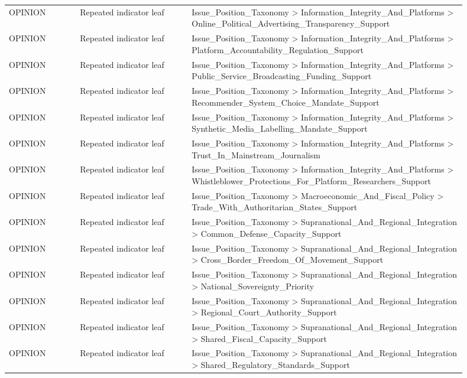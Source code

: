 \begin{table}[htbp]
\begin{threeparttable}
\begin{tabular}{p{0.14\linewidth}p{0.22\linewidth}p{0.54\linewidth}}
OPINION & Repeated indicator leaf & Issue\_Position\_Taxonomy > Information\_Integrity\_And\_Platforms > Online\_Political\_Advertising\_Transparency\_Support \\
OPINION & Repeated indicator leaf & Issue\_Position\_Taxonomy > Information\_Integrity\_And\_Platforms > Platform\_Accountability\_Regulation\_Support \\
OPINION & Repeated indicator leaf & Issue\_Position\_Taxonomy > Information\_Integrity\_And\_Platforms > Public\_Service\_Broadcasting\_Funding\_Support \\
OPINION & Repeated indicator leaf & Issue\_Position\_Taxonomy > Information\_Integrity\_And\_Platforms > Recommender\_System\_Choice\_Mandate\_Support \\
OPINION & Repeated indicator leaf & Issue\_Position\_Taxonomy > Information\_Integrity\_And\_Platforms > Synthetic\_Media\_Labelling\_Mandate\_Support \\
OPINION & Repeated indicator leaf & Issue\_Position\_Taxonomy > Information\_Integrity\_And\_Platforms > Trust\_In\_Mainstream\_Journalism \\
OPINION & Repeated indicator leaf & Issue\_Position\_Taxonomy > Information\_Integrity\_And\_Platforms > Whistleblower\_Protections\_For\_Platform\_Researchers\_Support \\
OPINION & Repeated indicator leaf & Issue\_Position\_Taxonomy > Macroeconomic\_And\_Fiscal\_Policy > Trade\_With\_Authoritarian\_States\_Support \\
OPINION & Repeated indicator leaf & Issue\_Position\_Taxonomy > Supranational\_And\_Regional\_Integration > Common\_Defense\_Capacity\_Support \\
OPINION & Repeated indicator leaf & Issue\_Position\_Taxonomy > Supranational\_And\_Regional\_Integration > Cross\_Border\_Freedom\_Of\_Movement\_Support \\
OPINION & Repeated indicator leaf & Issue\_Position\_Taxonomy > Supranational\_And\_Regional\_Integration > National\_Sovereignty\_Priority \\
OPINION & Repeated indicator leaf & Issue\_Position\_Taxonomy > Supranational\_And\_Regional\_Integration > Regional\_Court\_Authority\_Support \\
OPINION & Repeated indicator leaf & Issue\_Position\_Taxonomy > Supranational\_And\_Regional\_Integration > Shared\_Fiscal\_Capacity\_Support \\
OPINION & Repeated indicator leaf & Issue\_Position\_Taxonomy > Supranational\_And\_Regional\_Integration > Shared\_Regulatory\_Standards\_Support \\

\end{tabular}
\end{threeparttable}
\end{table}
